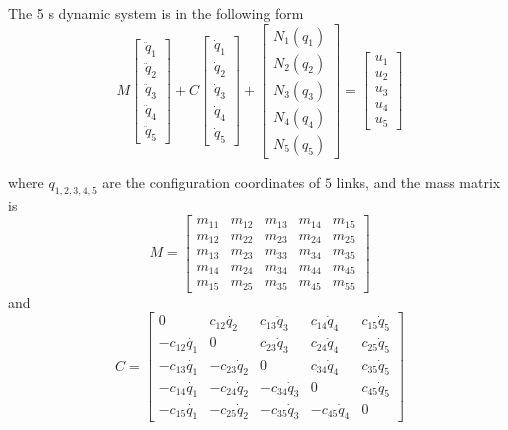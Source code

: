 The  5 {\dof}s dynamic system is in the following form
\[
M\left[\begin{array}{c}
\ddot{q}_{1}\\
\ddot{q}_{2}\\
\ddot{q}_{3}\\
\ddot{q}_{4}\\
\ddot{q}_{5}\end{array}\right]+C\left[\begin{array}{c}
\dot{q}_{1}\\
\dot{q}_{2}\\
\dot{q}_{3}\\
\dot{q}_{4}\\
\dot{q}_{5}\end{array}\right]+\left[\begin{array}{c}
N_{1}(q_{1})\\
N_{2}(q_{2})\\
N_{3}(q_{3})\\
N_{4}(q_{4})\\
N_{5}(q_{5})\end{array}\right]=\left[\begin{array}{c}
u_{1}\\
u_{2}\\
u_{3}\\
u_{4}\\
u_{5}\end{array}\right]
\]

where $q_{1,2,3,4,5}$ are the configuration coordinates of $5$ links,
and the mass matrix is
\[
M=\left[\begin{array}{ccccc}
m_{11} & m_{12} & m_{13} & m_{14} & m_{15}\\
m_{12} & m_{22} & m_{23} & m_{24} & m_{25}\\
m_{13} & m_{23} & m_{33} & m_{34} & m_{35}\\
m_{14} & m_{24} & m_{34} & m_{44} & m_{45}\\
m_{15} & m_{25} & m_{35} & m_{45} & m_{55}\end{array}\right]
\]
and
\[
C=\left[\begin{array}{ccccc}
0 & c_{12}\dot{q_{2}} & c_{13}\dot{q}_{3} & c_{14}\dot{q}_{4} & c_{15}\dot{q}_{5}\\
-c_{12}\dot{q_{1}} & 0 & c_{23}\dot{q}_{3} & c_{24}\dot{q}_{4} & c_{25}\dot{q}_{5}\\
-c_{13}\dot{q_{1}} & -c_{23}\dot{q}_{2} & 0 & c_{34}\dot{q}_{4} & c_{35}\dot{q}_{5}\\
-c_{14}\dot{q_{1}} & -c_{24}\dot{q}_{2} & -c_{34}\dot{q}_{3} & 0 & c_{45}\dot{q}_{5}\\
-c_{15}\dot{q_{1}} & -c_{25}\dot{q}_{2} & -c_{35}\dot{q}_{3} & -c_{45}\dot{q}_{4} & 0\end{array}\right]
\]





